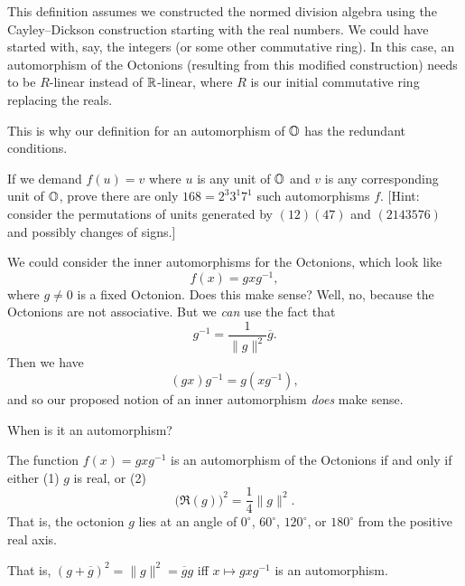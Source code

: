 \begin{remark}
This definition assumes we constructed the normed division algebra using
the Cayley--Dickson construction starting with the real numbers. We
could have started with, say, the integers (or some other commutative
ring). In this case, an automorphism of the Octonions (resulting from
this modified construction) needs to be $R$-linear instead of $\mathbb{R}$-linear,
where $R$ is our initial commutative ring replacing the reals.

This is why our definition for an automorphism of $\mathbb{O}$ has the
redundant conditions.
\end{remark}

\begin{exercise}
If we demand $f(u)=v$ where $u$ is any unit of $\mathbb{O}$ and $v$ is any
corresponding unit of $\mathbb{O}$, prove there are only $168 = 2^{3}3^{1}7^{1}$
such automorphisms $f$.
[Hint: consider the permutations of units generated by $(12)(47)$ and
  $(2143576)$ and possibly changes of signs.]
\end{exercise}

We could consider the inner automorphisms for the Octonions, which look
like
\begin{equation}
f(x) = gxg^{-1},
\end{equation}
where $g\neq0$ is a fixed Octonion.
Does this make sense? Well, no, because the Octonions are not
associative. But we \emph{can} use the fact that
\begin{equation}
g^{-1} = \frac{1}{\|g\|^{2}}\overline{g}.
\end{equation}
Then we have
\begin{equation}
(gx)g^{-1} = g(xg^{-1}),
\end{equation}
and so our proposed notion of an inner automorphism \emph{does} make
sense.

When is it an automorphism?

\begin{theorem}
The function $f(x)=gxg^{-1}$ is an automorphism of the Octonions if and
only if either
(1) $g$ is real, or (2)
\begin{equation}
\bigl(\Re(g)\bigr)^{2} = \frac{1}{4}\|g\|^{2}.
\end{equation}
That is, the octonion $g$ lies at an angle of $0^{\circ}$, $60^{\circ}$,
$120^{\circ}$, or $180^{\circ}$ from the positive real axis.
\end{theorem}

That is, $(g + \overline{g})^{2} = \|g\|^{2} = \overline{g}g$ iff
$x\mapsto gxg^{-1}$ is an automorphism.